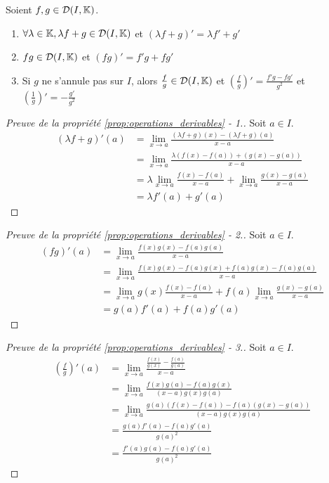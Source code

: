 \documentclass[12pt, a4paper]{report}
\begin{document}
\begin{property}
    \label{prop:operations_derivables}
    Soient $f,g \in \mathcal{D}(I,\mathbb{K})$.

    \begin{enumerate}
        \item $\forall \lambda \in \mathbb{K}, \lambda f + g \in \mathcal{D}(I,\mathbb{K})$ et $(\lambda f + g)' = \lambda f' + g'$
        \item $fg \in \mathcal{D}(I,\mathbb{K})$ et $(fg)' = f'g + fg'$
        \item Si $g$ ne s'annule pas sur $I$, alors $\frac{f}{g} \in \mathcal{D}(I,\mathbb{K})$ et $\left(\frac{f}{g}\right)' = \frac{f'g - fg'}{g^2}$ et $\left(\frac{1}{g}\right)' = -\frac{g'}{g^2}$
    \end{enumerate}
\end{property}

\begin{proof}[Preuve de la propriété \ref{prop:operations_derivables} - 1.]
    Soit $a \in I$.
    \begin{align*}
        (\lambda f + g)'(a) &= \lim_{x\to a} \frac{(\lambda f + g)(x) - (\lambda f + g)(a)}{x-a} \\
        &= \lim_{x\to a} \frac{\lambda (f(x) - f(a)) + (g(x) - g(a))}{x-a} \\
        &= \lambda \lim_{x\to a} \frac{f(x) - f(a)}{x-a} + \lim_{x\to a} \frac{g(x) - g(a)}{x-a} \\
        &= \lambda f'(a) + g'(a)
    \end{align*}
\end{proof}

\begin{proof}[Preuve de la propriété \ref{prop:operations_derivables} - 2.]
    Soit $a \in I$.
    \begin{align*}
        (fg)'(a) &= \lim_{x\to a} \frac{f(x)g(x) - f(a)g(a)}{x-a} \\
        &= \lim_{x\to a} \frac{f(x)g(x) - f(a)g(x) + f(a)g(x) - f(a)g(a)}{x-a} \\
            &= \lim_{x\to a} g(x)\frac{f(x) - f(a)}{x-a} + f(a)\lim_{x\to a} \frac{g(x) - g(a)}{x-a} \\
            &= g(a)f'(a) + f(a)g'(a)
    \end{align*}
\end{proof}
    
\begin{proof}[Preuve de la propriété \ref{prop:operations_derivables} - 3.]
    Soit $a \in I$.
    \begin{align*}
        \left(\frac{f}{g}\right)'(a) &= \lim_{x\to a} \frac{\frac{f(x)}{g(x)} - \frac{f(a)}{g(a)}}{x-a} \\
            &= \lim_{x\to a} \frac{f(x)g(a) - f(a)g(x)}{(x-a)g(x)g(a)} \\
            &= \lim_{x\to a} \frac{g(a)(f(x)-f(a)) - f(a)(g(x)-g(a))}{(x-a)g(x)g(a)} \\
            &= \frac{g(a)f'(a) - f(a)g'(a)}{g(a)^2} \\
            &= \frac{f'(a)g(a) - f(a)g'(a)}{g(a)^2}
    \end{align*}
\end{proof}
\end{document}

